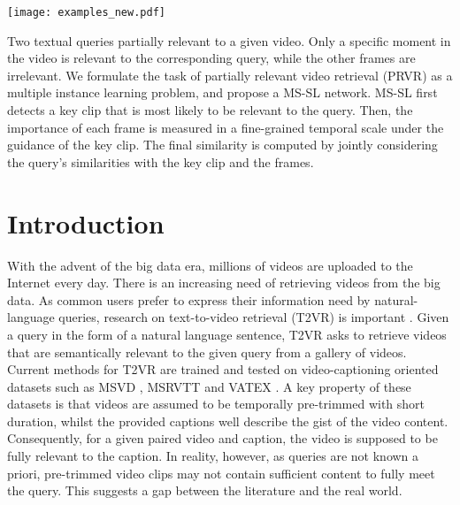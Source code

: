 \documentclass[sigconf]{acmart}
\begin{document}
\begin{teaserfigure}
  \texttt{[image: examples\_new.pdf]}
  \vspace{-6mm}
  \caption{Two textual queries partially relevant to a given video. Only a specific moment in the video is relevant to the corresponding query, while the other frames are irrelevant. We formulate the task of partially relevant video retrieval (PRVR) as a multiple instance learning problem, and propose a MS-SL network.
  MS-SL first detects a key clip that is most likely to be relevant to the query. Then, the importance of each frame is measured in a fine-grained temporal scale under the guidance of the key clip. The final similarity is computed by jointly considering the query's similarities with the key clip and the frames.
  }
\label{fig:teaser}
\end{teaserfigure}
\maketitle


\section{Introduction}\label{sec:introduction}


With the advent of the big data era, millions of videos are uploaded to the Internet every day. There is an increasing need of retrieving videos from the big data. 
As common users prefer to express their information need by natural-language queries, research on text-to-video retrieval (T2VR) is important \cite{li2020sea,sigir2020tree,croitoru2021teachtext}.
Given a query in the form of a natural language sentence, T2VR asks to retrieve videos that are semantically relevant to the given query from a gallery of videos.
Current methods \cite{liu2019use,jin2021hierarchical,chen2020fine,gabeur2020multi,han2021fine,luo2021clip4clip} for T2VR are trained and tested on video-captioning oriented datasets such as MSVD \cite{chen2011collecting}, MSRVTT \cite{xu2016msr} and VATEX \cite{wang2019vatex}. A key property of these datasets is that videos are assumed to be temporally pre-trimmed with short duration, whilst the provided captions well describe the gist of the video content. Consequently, for a given paired video and caption, the video is supposed to be fully relevant to the caption. In reality, however,  as queries are not known a priori, pre-trimmed video clips may not contain sufficient content to fully meet the query. This suggests a gap between the literature and the real world. 
\end{document}
